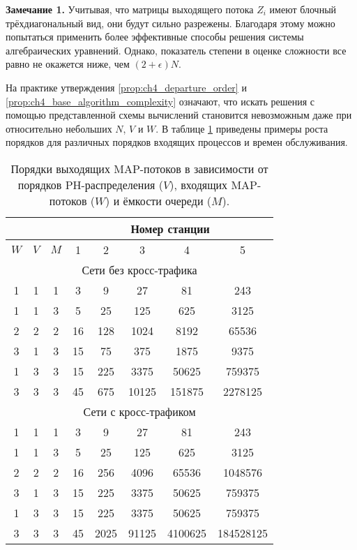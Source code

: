 \textbf{Замечание 1.} Учитывая, что матрицы выходящего потока $Z_i$ имеют блочный трёхдиагональный вид, они будут сильно разрежены. Благодаря этому можно попытаться применить более эффективные способы решения системы алгебраических уравнений. Однако, показатель степени в оценке сложности все равно не окажется ниже, чем $(2 + \epsilon) N$. 


На практике утверждения \ref{prop:ch4_departure_order} и \ref{prop:ch4_base_algorithm_complexity} означают, что искать решения с помощью представленной схемы вычислений становится невозможным даже при относительно небольших $N$, $V$ и $W$. В таблице \ref{table:ch4_map_order_growth} приведены примеры роста порядков для различных порядков входящих процессов и времен обслуживания.

\begin{table}[h!]
\centering
\begin{tabular}{ |c|c|c||c|c|c|c|c| }
\hline
\multicolumn{3}{|c||}{} & \multicolumn{5}{c|}{Номер станции} \\
\hline
$W$ & $V$ & $M$ & 1 & 2 & 3 & 4 & 5\\
\hline
\multicolumn{8}{|c|}{Сети без кросс-трафика} \\
\hline
1 & 1 & 1 & 3 & 9 & 27 & 81 & 243 \\
1 & 1 & 3 & 5 & 25 & 125 & 625 & 3125 \\
2 & 2 & 2 & 16 & 128 & 1024 & 8192 & 65536 \\
3 & 1 & 3 & 15 & 75 & 375 & 1875 & 9375 \\
1 & 3 & 3 & 15 & 225 & 3375 & 50625 & 759375 \\
3 & 3 & 3 & 45 & 675 & 10125 & 151875 & 2278125 \\
\hline
\multicolumn{8}{|c|}{Сети с кросс-трафиком} \\
\hline
1 & 1 & 1 & 3 & 9 & 27 & 81 & 243 \\
1 & 1 & 3 & 5 & 25 & 125 & 625 & 3125 \\
2 & 2 & 2 & 16 & 256 & 4096 & 65536 & 1048576 \\
3 & 1 & 3 & 15 & 225 & 3375 & 50625 & 759375 \\
1 & 3 & 3 & 15 & 225 & 3375 & 50625 & 759375 \\
3 & 3 & 3 & 45 & 2025 & 91125 & 4100625 & 184528125 \\
\hline
\end{tabular}
\caption{Порядки выходящих MAP-потоков в зависимости от порядков PH-распределения ($V$), входящих MAP-потоков ($W$) и ёмкости очереди ($M$).\label{table:ch4_map_order_growth}
}
\end{table}

